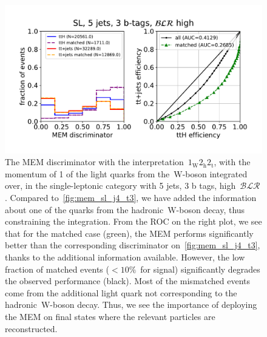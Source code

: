 \begin{figure}
\begin{centering}
\includegraphics[width = 1.0\textwidth]{figures/mem_sl_j5_t3_blrH.pdf}
\caption{The MEM discriminator with the interpretation~$1_{\mathrm{W}} 2_{\mathrm{h}} 2_{\mathrm{t}}$, with the momentum of 1 of the light quarks from the~$\mathrm{W}$-boson integrated over, in the single-leptonic category with 5 jets, 3 b tags, high~$\mathcal{BLR}$. Compared to~\cref{fig:mem_sl_j4_t3}, we have added the information about one of the quarks from the hadronic~$\mathrm{W}$-boson decay, thus constraining the integration. From the ROC on the right plot, we see that for the matched case (green), the MEM performs significantly better than the corresponding discriminator on~\cref{fig:mem_sl_j4_t3}, thanks to the additional information available. However, the low fraction of matched events ($< 10\%$~for signal) significantly degrades the observed performance (black). Most of the mismatched events come from the additional light quark not corresponding to the hadronic~$\mathrm{W}$-boson decay. Thus, we see the importance of deploying the MEM on final states where the relevant particles are reconstructed.}
\label{fig:mem_sl_j5_t3}
\end{centering}
\end{figure}

